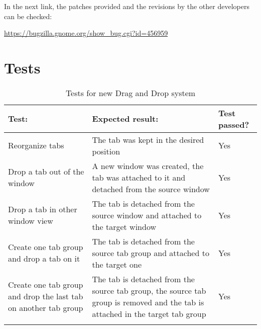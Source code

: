 In the next link, the patches provided and the revisions by the other developers  can be checked: 

\noindent\url{https://bugzilla.gnome.org/show_bug.cgi?id=456959}

\newpage
\section{Tests}

\begin{table}[H]
  \begin{center}
    \begin{tabularx}{\textwidth}{|X|X|l|}
      \firsthline
      \textbf{Test:} & \textbf{Expected result:} & \textbf{Test passed?} \\
      \hline
      Reorganize tabs & The tab was kept in the desired position & Yes \\
      \hline
      Drop a tab out of the window & A new window was created, the tab was attached to it and detached from the source window & Yes \\
      \hline
      Drop a tab in other window view & The tab is detached from the source window and attached to the target window & Yes \\
      \hline
      Create one tab group and drop a tab on it & The tab is detached from the source tab group and attached to the target one & Yes \\
      \hline
      Create one tab group and drop the last tab on another tab group & The tab is detached from the source tab group, the source tab group is removed and the tab is attached in the target tab group & Yes \\
      \lasthline
    \end{tabularx}
    \caption{Tests for new Drag and Drop system}
  \end{center}
\end{table}
